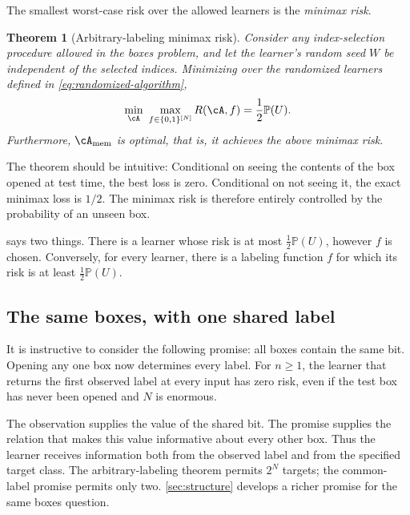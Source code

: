 \documentclass[11pt,twoside]{article}
\renewcommand{\P}{\mathbb P}
\newcommand{\cAmem}{\cA_{\mathrm{mem}}}
\newtheorem{theorem}{Theorem}[section]
\theoremstyle{definition}
\theoremstyle{remark}
\begin{document}
The smallest worst-case risk over the allowed learners is the \emph{minimax risk}.

\begin{theorem}[Arbitrary-labeling minimax risk]
\label{thm:arbitrary-labels}
Consider any index-selection procedure allowed in the boxes problem, and let
the learner's random seed $W$ be independent of the selected indices.
Minimizing over the randomized learners defined in
\cref{eq:randomized-algorithm},
\begin{equation}
\min_{\cA}\ \max_{f\in\{0,1\}^{[N]}} R(\cA,f)
=\frac12\P(U).
\label{eq:minimax-risk}
\end{equation}
Furthermore, $\cAmem$ is optimal, that is, it achieves
the above minimax risk.
\end{theorem}

The theorem should be intuitive:
Conditional on seeing the contents of the box
opened at test time, the best loss is zero.
Conditional on not seeing it, the exact minimax loss is $1/2$.
The minimax risk is therefore entirely controlled by the
probability of an unseen box.\label{rem:deterministic-minimax}

 says two things. There is a learner whose risk is at
most $\tfrac12\P(U)$, however $f$ is chosen. Conversely, for every learner,
there is a labeling function $f$ for which its risk is at least
$\tfrac12\P(U)$.

\subsection{The same boxes, with one shared label}
\label{sec:constant-boxes}

It is instructive to consider the following promise: all boxes contain the same
bit.
Opening any one box now determines every label. For $n\ge1$, the learner
that returns the first observed label at every input has zero risk, even if
the test box has never been opened and $N$ is enormous.

The observation supplies the value of the shared bit. The promise supplies
the relation that makes this value informative about every other box. Thus
the learner receives information both from the observed label and from the
specified target class. The arbitrary-labeling theorem permits $2^N$ targets;
the common-label promise permits only two. \cref{sec:structure} develops
a richer promise for the same boxes question.
\end{document}
